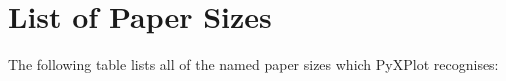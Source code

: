 %
%
%
%
%



\chapter{List of Paper Sizes}
\label{paper_sizes}

The following table lists all of the named paper sizes which PyXPlot recognises:

